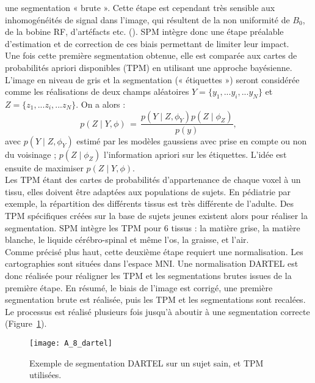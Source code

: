 une segmentation « brute ». Cette étape est cependant très sensible aux inhomogénéités de signal
dans l’image, qui résultent de la non uniformité de $B_0$, de la bobine RF, d’artéfacts etc. (\cite{Kwan1999}). SPM
intègre donc une étape préalable d’estimation et de correction de ces biais permettant de limiter leur
impact.\\
Une fois cette première segmentation obtenue, elle est comparée aux cartes de probabilités
apriori disponibles (TPM) en utilisant une approche bayésienne. L’image en niveau de gris et la
segmentation (« étiquettes ») seront considérée comme les réalisations de deux champs aléatoires $Y
= \{y_1, ... y_i, ... y_N\}$ et $Z = \{z_1, ... z_i, ... z_N\}$. On a alors :
\begin{equation}
p(Z\mid Y,\phi)\,=\,\frac{p(Y\mid Z,\phi_Y) p(Z\mid \phi_Z)}{p(y)},
\end{equation}
avec $p(Y\mid Z,\phi_Y)$ estimé par les modèles gaussiens avec prise en compte ou non du voisinage ; $p(Z\mid \phi_Z)$
l’information apriori sur les étiquettes. L’idée est ensuite de maximiser $p(Z\mid Y,\phi)$.\\
Les TPM étant des cartes de probabilités d’appartenance de chaque voxel à un tissu, elles
doivent être adaptées aux populations de sujets. En pédiatrie par exemple, la répartition des différents
tissus est très différente de l’adulte. Des TPM spécifiques créées sur la base de sujets jeunes existent
alors pour réaliser la segmentation. SPM intègre les TPM pour 6 tissus : la matière grise, la matière
blanche, le liquide cérébro-spinal et même l’os, la graisse, et l’air.\\
Comme précisé plus haut, cette deuxième étape requiert une normalisation. Les cartographies
sont situées dans l’espace MNI. Une normalisation DARTEL est donc réalisée pour réaligner les TPM et
les segmentations brutes issues de la première étape. En résumé, le biais de l’image est corrigé, une
première segmentation brute est réalisée, puis les TPM et les segmentations sont recalées. Le
processus est réalisé plusieurs fois jusqu’à aboutir à une segmentation correcte (Figure~\ref{fig:A_8_dartel}).
\begin{figure}[!t]
\centering
\texttt{[image: A\_8\_dartel]}
\caption{Exemple de segmentation DARTEL sur un sujet sain, et TPM utilisées.}
\label{fig:A_8_dartel}	
\end{figure}
